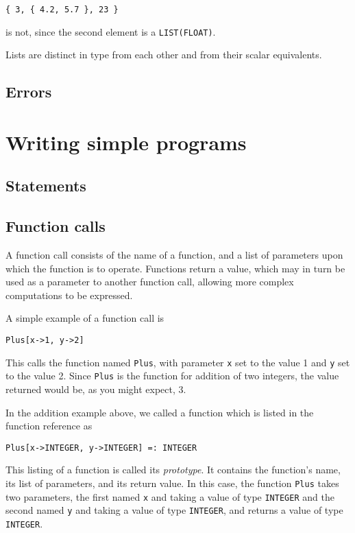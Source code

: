 \begin{verbatim}
{ 3, { 4.2, 5.7 }, 23 }
\end{verbatim}

\noindent is not, since the second element is a {\tt LIST(FLOAT)}.

Lists are distinct in type from each other and from their scalar equivalents.

\subsection{Errors}

\section{Writing simple programs}

\subsection{Statements}

\subsection{Function calls}

A function call consists of the name of a function, and a list of parameters
upon which the function is to operate.  Functions return a value, which
may in turn be used as a parameter to another function call, allowing more
complex computations to be expressed.

A simple example of a function call is

\begin{verbatim}
Plus[x->1, y->2]
\end{verbatim}

This calls the function named {\tt Plus}, with parameter \verb+x+ set to
the value 1 and \verb+y+ set to the value 2.  Since {\tt Plus} is the function
for addition of two integers, the value returned would be, as you might
expect, 3.

In the addition example above, we called a function which is listed in
the function reference as

\begin{verbatim}
Plus[x->INTEGER, y->INTEGER] =: INTEGER
\end{verbatim}

\noindent This listing of a function is called its {\it prototype}.  
It contains the function's name, its list of parameters, and its return
value.  In this case, the function {\tt Plus} takes two parameters, the
first named \verb+x+ and taking a value of type {\tt INTEGER} and the
second named \verb+y+ and taking a value of type {\tt INTEGER}, and
returns a value of type {\tt INTEGER}.

